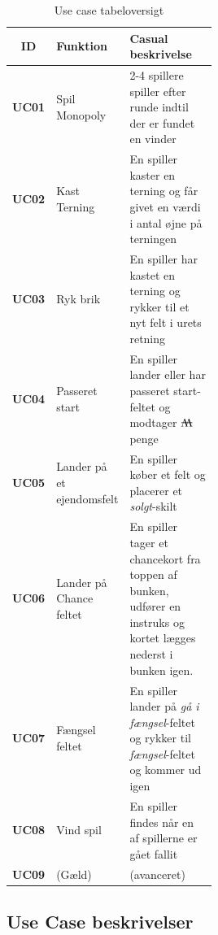 \documentclass[../main.tex]{subfiles}
\begin{document}
\begin{table}[H]
\begin{tabular}{|c|l|p{0.5\linewidth}|}
\hline
 \textbf{ID} & \textbf{Funktion} & \textbf{Casual beskrivelse} \\\hline
\textbf{UC01} & Spil Monopoly  & 2-4 spillere spiller efter runde indtil der er fundet en vinder\\ \hline
\textbf{UC02} & Kast Terning   & En spiller kaster en terning og får givet en værdi i antal øjne på terningen \\ \hline
\textbf{UC03} & Ryk brik   & En spiller har kastet en terning og rykker til et nyt felt i urets retning\\ \hline
\textbf{UC04} & Passeret start   & En spiller lander eller har passeret start-feltet og modtager $\M$ penge\\ \hline
\textbf{UC05} & Lander på et ejendomsfelt  &  En spiller køber et felt og placerer et \textit{solgt}-skilt\\ \hline
\textbf{UC06} & Lander på Chance feltet   & En spiller tager et chancekort fra toppen af bunken, udfører en instruks og kortet lægges nederst i bunken igen.\\ \hline
\textbf{UC07} & Fængsel feltet   & En spiller lander på \textit{gå i fængsel}-feltet og rykker til \textit{fængsel}-feltet og kommer ud igen \\ \hline
\textbf{UC08} & Vind spil   & En spiller findes når en af spillerne er gået fallit  \\ \hline
\textbf{UC09} & (Gæld)   & (avanceret) \\ \hline
\end{tabular}
\caption{Use case tabeloversigt}
\label{tab:UC-tabeloversigt}
\end{table}


\subsection{Use Case beskrivelser\textit{}}
\end{document}
